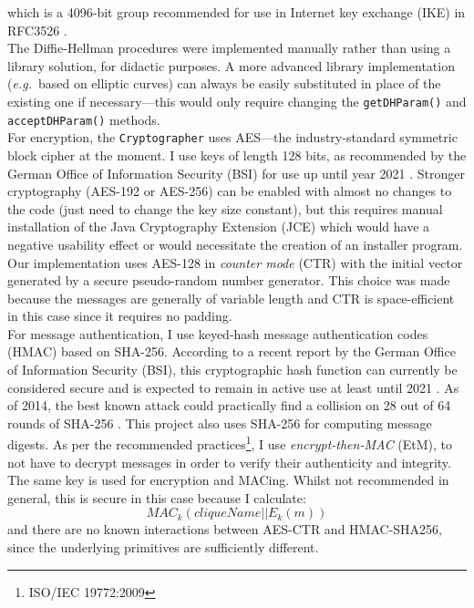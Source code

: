 \documentclass[a4paper, twoside, 12pt]{report}
\begin{document}
which is a 4096-bit group recommended for use in Internet key exchange (IKE) in RFC3526 \cite{kivinen2003more}.\\

The Diffie-Hellman procedures were implemented manually rather than using a library solution, for didactic purposes. A more advanced library implementation (\textit{e.g.}~based on elliptic curves) can always be easily substituted in place of the existing one if necessary---this would only require changing the \texttt{getDHParam()} and \texttt{acceptDHParam()} methods. \\ 

For encryption, the \texttt{Cryptographer} uses AES---the industry-standard symmetric block cipher at the moment. I use keys of length 128 bits, as recommended by the German Office of Information Security (BSI) for use up until year 2021 \cite{margraf2016kryptographische}. Stronger cryptography (AES-192 or AES-256) can be enabled with almost no changes to the code (just need to change the key size constant), but this requires manual installation of the Java Cryptography Extension (JCE) which would have a negative usability effect or would necessitate the creation of an installer program. Our implementation uses AES-128 in \emph{counter mode} (CTR) with the initial vector generated by a secure pseudo-random number generator. This choice was made because the messages are generally of variable length and CTR is space-efficient in this case since it requires no padding. \\

For message authentication, I use keyed-hash message authentication codes (HMAC) based on SHA-256. According to a recent report by the German Office of Information Security (BSI), this cryptographic hash function can currently be considered secure and is expected to remain in active use at least until 2021 \cite{margraf2016kryptographische}. As of 2014, the best known attack could practically find a collision on 28 out of 64 rounds of SHA-256 \cite{dobraunig2014analysis}. This project also uses SHA-256 for computing message digests. As per the recommended practices\footnote{ISO/IEC 19772:2009}, I use \emph{encrypt-then-MAC} (EtM), to not have to decrypt messages in order to verify their authenticity and integrity. \\

The same key is used for encryption and MACing. Whilst not recommended in general, this is secure in this case because I calculate:
\begin{equation*}
    MAC_k(cliqueName||E_k(m))
\end{equation*}
and there are no known interactions between AES-CTR and HMAC-SHA256, since the underlying primitives are sufficiently different.
\end{document}
